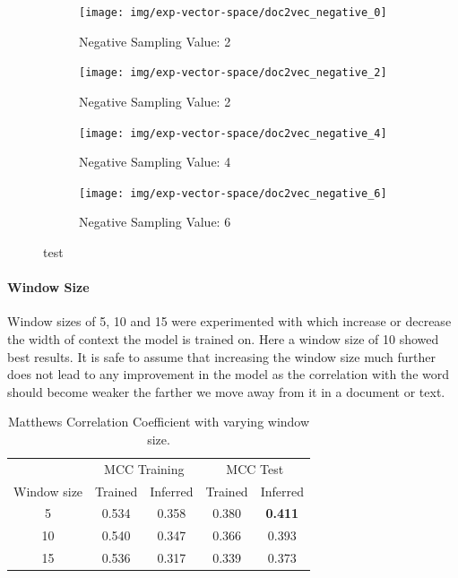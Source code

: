 \begin{figure}[h!]
    \centering
    \begin{subfigure}[b]{0.49\textwidth}
      \texttt{[image: img/exp-vector-space/doc2vec\_negative\_0]}
      \caption{Negative Sampling Value: 2}
\label{fig:doc2vec_negative_0}
    \end{subfigure}
    \begin{subfigure}[b]{0.49\textwidth}
      \texttt{[image: img/exp-vector-space/doc2vec\_negative\_2]}
    \caption{Negative Sampling Value: 2}
\label{fig:doc2vec_vector_size_2}
    \end{subfigure}
    \begin{subfigure}[b]{0.49\textwidth}
      \texttt{[image: img/exp-vector-space/doc2vec\_negative\_4]}
      \caption{Negative Sampling Value: 4}
\label{fig:doc2vec_vector_size_4}
  \end{subfigure}
  \begin{subfigure}[b]{0.49\textwidth}
    \texttt{[image: img/exp-vector-space/doc2vec\_negative\_6]}
    \caption{Negative Sampling Value: 6}
\label{fig:doc2vec_negative_6}
  \end{subfigure}
\caption{test}
\label{fig:doc2vec_negative}
\end{figure}

\paragraph{Window Size}
Window sizes of 5, 10 and 15 were experimented with which increase or decrease the width of context the model is trained on. Here a window size of 10 showed best results. It is safe to assume that increasing the window size much further does not lead to any improvement in the model as the correlation with the word should become weaker the farther we move away from it in a document or text.

\begin{table}[h]
  \begin{center}
    \begin{tabular}{ c | *2c | *2c }
      \toprule
       & \multicolumn{2}{c|}{MCC Training} & \multicolumn{2}{|c}{MCC Test}\\
      Window size & Trained & Inferred & Trained & Inferred \\
      \midrule
      5 & 0.534 & 0.358 & 0.380 & \textbf{0.411} \\
      10 & 0.540 & 0.347 & 0.366 & 0.393 \\
      15 & 0.536 & 0.317 & 0.339 & 0.373 \\
    \bottomrule
    \end{tabular}
  \caption{Matthews Correlation Coefficient with varying window size.}
\label{tab:Paragraph Vector Parameter Results Window Size}
\end{center}
\end{table}

